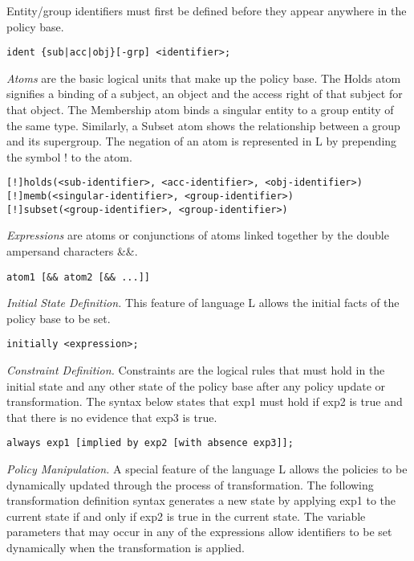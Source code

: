 \documentclass{llncs}
\begin{document}
    Entity/group identifiers must first be defined before they appear
    anywhere in the policy base.

    \begin{verbatim}ident {sub|acc|obj}[-grp] <identifier>;\end{verbatim}

    \emph{Atoms} are the basic logical units that make up the policy base.
    The Holds atom signifies a binding of a subject, an object and the
    access right of that subject for that object. The Membership atom binds
    a singular entity to a group entity of the same type. Similarly, a Subset
    atom shows the relationship between a group and its supergroup. The
    negation of an atom is represented in L by prepending the symbol ! to the
    atom.

    \begin{verbatim}[!]holds(<sub-identifier>, <acc-identifier>, <obj-identifier>)
[!]memb(<singular-identifier>, <group-identifier>)
[!]subset(<group-identifier>, <group-identifier>)\end{verbatim}

    \emph{Expressions} are atoms or conjunctions of atoms linked together by
    the double ampersand characters \&\&.

    \begin{verbatim}atom1 [&& atom2 [&& ...]]\end{verbatim}

    \emph{Initial State Definition.} This feature of language L allows the
    initial facts of the policy base to be set.

    \begin{verbatim}initially <expression>;\end{verbatim}

    \emph{Constraint Definition.} Constraints are the logical rules that must
    hold in the initial state and any other state of the policy base after
    any policy update or transformation. The syntax below states that exp1
    must hold if exp2 is true and that there is no evidence that exp3 is
    true.

    \begin{verbatim}always exp1 [implied by exp2 [with absence exp3]];\end{verbatim}

    \emph{Policy Manipulation.} A special feature of the language L allows
    the policies to be dynamically updated through the process of
    transformation. The following transformation definition syntax generates
    a new state by applying exp1 to the current state if and only if exp2 is
    true in the current state. The variable parameters that may occur in any
    of the expressions allow identifiers to be set dynamically when the
    transformation is applied.
\end{document}
